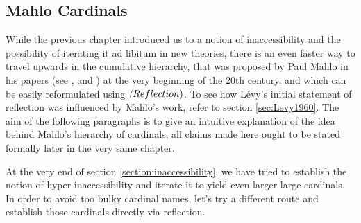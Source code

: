 \documentclass[12pt,a4paper]{article}
\newcommand{\power}[1]{\ensuremath{\mathscr{P}} (#1)}
\begin{document}
\begin{}
{\begin{comment}
 \newline\newline
 Next, let's see whether $\kappa$ is indeed a~strong limit, again by contradiction. If not, there would be a~$\lambda < \kappa$ such that $2^\lambda \geq \kappa$. Let $G: \power{\lambda} \implies \kappa$ be surjective and set $R = \{\lambda + 1\} \cup G$. By hypothesis, there is an $\alpha < \kappa$ such that $\langle V_\alpha, \in, R \cap V_\alpha \rangle \prec \langle V_\kappa, \in, R \rangle$. $\lambda + 1 \in V_\alpha$ and so $\power{\lambda} \in V_\alpha$, but this is again a~contradiction.
\end{proof}
\
\end{comment}
}

%
%

\subsection{Mahlo Cardinals}


While the previous chapter introduced us to a notion of inaccessibility and the possibility of iterating it ad libitum in new theories, there is an even faster way to travel upwards in the cumulative hierarchy, that was proposed by Paul Mahlo in his papers (see \cite{Mahlo11}, \cite{Mahlo12} and \cite{Mahlo13}) at the very beginning of the 20th century, and which can be easily reformulated using $\emph(Reflection)$. To see how Lévy's initial statement of reflection was influenced by Mahlo's work, refer to section \ref{sec:Levy1960}. The aim of the following paragraphs is to give an intuitive explanation of the idea behind Mahlo's hierarchy of cardinals, all claims made here ought to be stated formally later in the very same chapter.

At the very end of section \ref{section:inaccessibility}, we have tried to establish the notion of hyper-inaccessibility and iterate it to yield even larger large cardinals. In order to avoid too bulky cardinal names, let's try a different route and establish those cardinals directly via reflection.

\


\end{}
\end{document}
